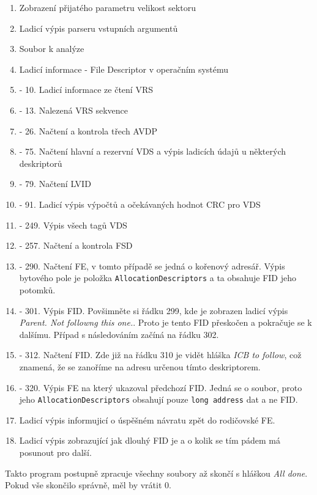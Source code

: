 \begin{enumerate}
    \item Zobrazení přijatého parametru velikost sektoru
    \item Ladicí výpis parseru vstupních argumentů
    \item Soubor k analýze
    \item Ladicí informace - File Descriptor v operačním systému
    \item - 10. Ladicí informace ze čtení VRS \addtocounter{enumi}{5}
    \item - 13. Nalezená VRS sekvence \addtocounter{enumi}{2}
    \item - 26. Načtení a kontrola třech AVDP \addtocounter{enumi}{12}
    \item - 75. Načtení hlavní a rezervní VDS a výpis ladicích údajů u některých deskriptorů \addtocounter{enumi}{48}
    \item - 79. Načtení LVID \addtocounter{enumi}{3}
    \item - 91. Ladicí výpis výpočtů a očekávaných hodnot CRC pro VDS \addtocounter{enumi}{11}
    \item - 249. Výpis všech tagů VDS \addtocounter{enumi}{157}
    \item - 257. Načtení a kontrola FSD \addtocounter{enumi}{7}
    \item - 290. Načtení FE, v tomto případě se jedná o kořenový adresář. Výpis bytového pole je položka \texttt{AllocationDescriptors} a ta obsahuje FID jeho potomků. \addtocounter{enumi}{32}
    \item - 301. Výpis FID. Povšimněte si řádku 299, kde je zobrazen ladicí výpis \textit{Parent. Not followng this one.}. Proto je tento FID přeskočen a pokračuje se k dalšímu. Případ s následováním začíná na řádku 302. \addtocounter{enumi}{10}
    \item - 312. Načtení FID. Zde již na řádku 310 je vidět hláška \textit{ICB to follow}, což znamená, že se zanoříme na adresu určenou tímto deskriptorem. \addtocounter{enumi}{10}
    \item - 320. Výpis FE na který ukazoval předchozí FID. Jedná se o soubor, proto jeho \texttt{AllocationDescriptors} obsahují pouze \texttt{long address} dat a ne FID. \addtocounter{enumi}{7}
    \item Ladicí výpis informujicí o úspěšném návratu zpět do rodičovské FE.
    \item Ladicí výpis zobrazující jak dlouhý FID je a o kolik se tím pádem má posunout pro další.
\end{enumerate}
Takto program postupně zpracuje všechny soubory až skončí s hláškou \textit{All done}. Pokud vše skončilo správně, měl by vrátit 0.

